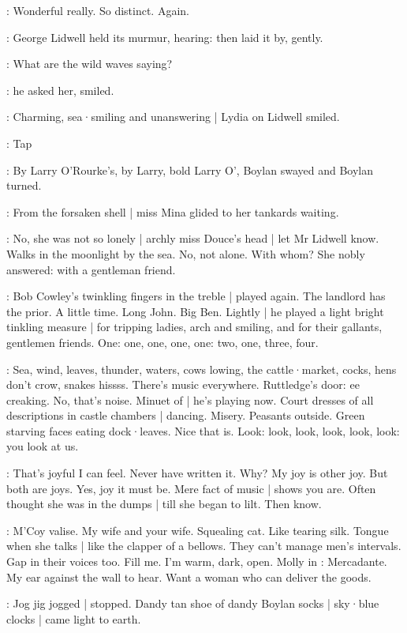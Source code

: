 \lidwell:
Wonderful really.
So distinct.
Again.

:
George Lidwell held its murmur,
hearing:
then laid it by,
gently.

\lidwell:
What are the wild waves saying?

:
he asked her,
smiled.

:
Charming,
sea·smiling and unanswering |
Lydia on Lidwell smiled.

\stripling:
Tap

:
By Larry O'Rourke's,
by Larry,
bold Larry O',
Boylan swayed
and Boylan turned.

:
From the forsaken shell |
miss Mina glided to her tankards waiting.

:
No,
she was not so lonely |
archly miss Douce's head |
let Mr Lidwell know.
Walks in the moonlight by the sea.
No,
not alone.
With whom?
She nobly answered:
with a gentleman friend.

:
Bob Cowley's twinkling fingers in the treble |
played again.
The landlord has the prior.
A little time.
Long John.
Big Ben.
Lightly |
he played a light bright tinkling measure |
for tripping ladies,
arch and smiling,
and for their gallants,
gentlemen friends.
One:
one,
one,
one,
one:
two,
one,
three,
four.

\BloomInt:
Sea,
wind,
leaves,
thunder,
waters,
cows lowing,
the cattle·market,
cocks,
hens don't crow,
snakes hissss.
There's music everywhere.
Ruttledge's door:
ee creaking.
No,
that's noise.
Minuet of  |
he's playing now.
Court dresses of all descriptions in castle chambers |
dancing.
Misery.
Peasants outside.
Green starving faces eating dock·leaves.
Nice that is.
Look:
look,
look,
look,
look,
look:
you look at us.

\BloomInt:
That's joyful I can feel.
Never have written it.
Why?
My joy is other joy.
But both are joys.
Yes,
joy it must be.
Mere fact of music |
shows you are.
Often thought she was in the dumps |
till she began to lilt.
Then know.

\BloomInt:
M'Coy valise.
My wife and your wife.
Squealing cat.
Like tearing silk.
Tongue when she talks |
like the clapper of a bellows.
They can't manage men's intervals.
Gap in their voices too.
Fill me.
I'm warm,
dark,
open.
Molly in :
Mercadante.
My ear against the wall to hear.
Want a woman who can deliver the goods.

:
Jog jig jogged |
stopped.
Dandy tan shoe of dandy Boylan socks |
sky·blue clocks |
came light to earth.

